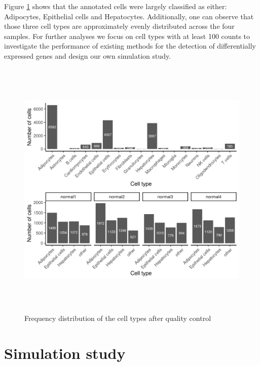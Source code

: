 \pagebreak

Figure \ref{fig:mouse_cell_type} shows that the annotated cells were largely classified as either: Adipocytes, Epithelial cells and Hepatocytes. Additionally, one can observe that those three cell types are approximately evenly distributed across the four samples. For further analyses we focus on cell types with at least 100 counts to investigate the performance of existing methods for the detection of differentially expressed genes and design our own simulation study.

\begin{figure}[!htb]
\begin{center}
\includegraphics[width=6in,height=5in]{figure/kidney_mouse/cell_type_distribution.png}
\end{center}
\caption{Frequency distribution of the cell types after quality control} 
\label{fig:mouse_cell_type}
\end{figure}
\FloatBarrier

\section{Simulation study}

